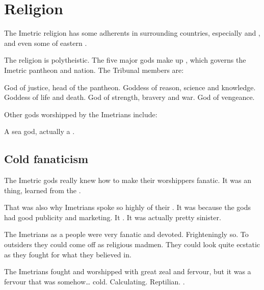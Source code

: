 \section{Religion}
The Imetric religion has some adherents in surrounding countries, especially  and , and even some of eastern . 

The religion is polytheistic. 
The five major gods make up , which governs the Imetric pantheon and nation. 
The Tribunal members are: 
  
\begin{gloss}
  \gitemlink[Sarokash]{\Sarokash} 
  \index{\Sarokash}
    God of justice, head of the pantheon.
    Goddess of reason, science and knowledge. 
  \index{\NishiS}
    Goddess of life and death. 
    God of strength, bravery and war. 
  \gitemlink[Hiothrex]{\Hiothrex}
  \index{\Hiothrex}
    God of vengeance. 
\end{gloss}

Other gods worshipped by the Imetrians include: 

\begin{gloss}
  A sea god, actually a \nagalord. 
\end{gloss}





\subsection{Cold fanaticism}
The Imetric gods really knew how to make their worshippers fanatic. 
It was an  thing, learned from the \nagae. 

That was also why Imetrians spoke so highly of their . 
It was because the gods had good publicity and marketing. 
It . 
It was actually pretty sinister.

The Imetrians as a people were very fanatic and devoted. 
Frighteningly so. 
To outsiders they could come off as religious madmen. 
They could look quite ecstatic as they fought for what they believed in. 

The Imetrians fought and worshipped with great zeal and fervour, but it was a fervour that was somehow\ldots{} cold. 
Calculating. 
Reptilian. 
\Ophidian. 

